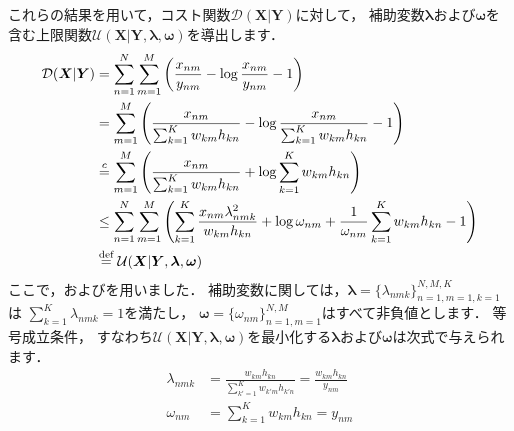 これらの結果を用いて，コスト関数$\mathcal{D}(\bm{X}|\bm{Y})$に対して，
補助変数$\bm\lambda$および$\bm\omega$を含む上限関数$\mathcal{U}(\bm{X}|\bm{Y},\bm\lambda,\bm\omega)$を導出します．
\begin{align}
\mathcal{D}(\bm{X}|\bm{Y}) 
&= \sum_{n=1}^N \sum_{m=1}^M \left(\frac{x_{nm}}{y_{nm}} - \log \frac{x_{nm}}{y_{nm}} - 1\right)
\nonumber\\
&= \sum_{m=1}^M \left(\frac{x_{nm}}{\sum_{k=1}^K w_{km} h_{kn}} - \log \frac{x_{nm}}{\sum_{k=1}^K w_{km} h_{kn}} - 1\right)
\nonumber\\
&\overset{c}{=}  \sum_{m=1}^M \left(\frac{x_{nm}}{\sum_{k=1}^K w_{km} h_{kn}} + \log \sum_{k=1}^K w_{km} h_{kn} \right)
\nonumber\\
&\le \sum_{n=1}^N \sum_{m=1}^M \left(\sum_{k=1}^K \frac{x_{nm} \lambda_{nmk}^2}{w_{km} h_{kn}} 
+ \log \omega_{nm} + \frac{1}{\omega_{nm}}\sum_{k=1}^K w_{km} h_{kn} - 1\right)
\nonumber\\
&\overset{\mbox{\scriptsize{def}}}{=} \mathcal{U}(\bm{X}|\bm{Y},\bm\lambda,\bm\omega)
\label{eqn:is_nmf_u}
\end{align}
ここで，およびを用いました．
補助変数に関しては，$\bm\lambda=\{\lambda_{nmk}\}_{n=1,m=1,k=1}^{N,M,K}$は
$\sum_{k=1}^K \lambda_{nmk} = 1$を満たし，
$\bm\omega=\{\omega_{nm}\}_{n=1,m=1}^{N,M}$はすべて非負値とします．
等号成立条件，
すなわち$\mathcal{U}(\bm{X}|\bm{Y},\bm\lambda,\bm\omega)$を最小化する$\bm\lambda$および$\bm\omega$は次式で与えられます．
\begin{align}
\lambda_{nmk} 
&= \frac{w_{km}h_{kn}}{\sum_{k'=1}^K w_{k'm}h_{k'n}}
= \frac{w_{km}h_{kn}}{y_{nm}}
\label{eqn:is_nmf_mu_lambda}
\\
\omega_{nm} 
&= \sum_{k=1}^K w_{km} h_{kn} = y_{nm}
\label{eqn:is_nmf_mu_omega}
\end{align}

